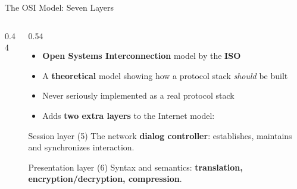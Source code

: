 \documentclass[aspectratio=169,11pt,xcolor={table}]{beamer}
\begin{document}
\begin{frame}{The OSI Model: Seven Layers}
  \begin{columns}[c]
    \begin{column}{0.44\textwidth}
      \centering
    \end{column}
    \begin{column}{0.54\textwidth}
      \begin{itemize}\setlength{\itemsep}{4pt}\small
        \item \textbf{Open Systems Interconnection} model by the \textbf{ISO}
        \item A \textbf{theoretical} model showing how a protocol stack \emph{should} be built
        \item Never seriously implemented as a real protocol stack
        \item Adds \textbf{two extra layers} to the Internet model:
      \end{itemize}
      \vspace{1mm}
      \begin{block}{Session layer (5)}
        \scriptsize The network \textbf{dialog controller}: establishes, maintains and synchronizes interaction.
      \end{block}
      \begin{block}{Presentation layer (6)}
        \scriptsize Syntax and semantics: \textbf{translation, encryption/decryption, compression}.
      \end{block}
    \end{column}
  \end{columns}
\end{frame}
\end{document}
